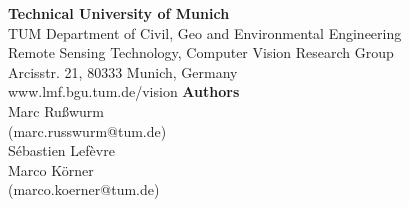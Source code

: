 \documentclass[a0]{tumposter}
\begin{document}
\hfill

\begin{footer}
	\begin{multicols}{2}
		\textbf{Technical University of Munich}\\
		TUM Department of Civil, Geo and Environmental Engineering \\
		Remote Sensing Technology, Computer Vision Research Group \\
		Arcisstr. 21, 80333 Munich, Germany \\
		www.lmf.bgu.tum.de/vision
	\vfill\columnbreak
		\textbf{Authors} \\
		Marc Rußwurm \\ (marc.russwurm@tum.de) \\
		Sébastien Lefèvre \\
		Marco Körner \\ (marco.koerner@tum.de)
	\vfill
	\end{multicols}
\end{footer}
\end{document}

